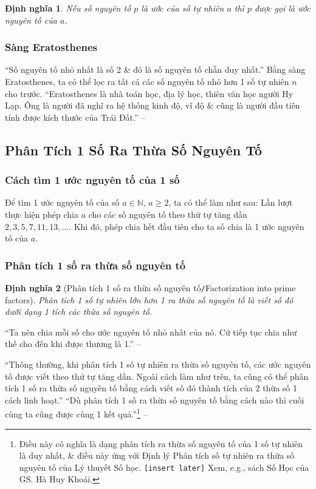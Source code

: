 \documentclass{article}
\numberwithin{equation}{section}
\newtheorem{definition}{Định nghĩa}[section]
\begin{document}
\begin{definition}
	Nếu số nguyên tố $p$ là ước của số tự nhiên $a$ thì $p$ được gọi là \emph{ước nguyên tố} của $a$.
\end{definition}

\subsubsection{Sàng Eratosthenes}
``Số nguyên tố nhỏ nhất là số 2 \& đó là số nguyên tố chẵn duy nhất.'' Bằng sàng Eratosthenes, ta có thể lọc ra tất cả các số nguyên tố nhỏ hơn 1 số tự nhiên $n$ cho trước. ``Eratosthenes là nhà toán học, địa lý học, thiên văn học người Hy Lạp. Ông là người đã nghĩ ra hệ thống kinh độ, vĩ độ \& cũng là người đầu tiên tính được kích thước của Trái Đất.'' -- \cite[p. 43]{Thai_Anh_Dat_Ha_Loan_Nam_Quang_Toan_6_tap_1}

\subsection{Phân Tích 1 Số Ra Thừa Số Nguyên Tố}

\subsubsection{Cách tìm 1 ước nguyên tố của 1 số}
\begin{tcolorbox}
	Để tìm 1 ước nguyên tố của số $a\in\mathbb{N}$, $a\ge 2$, ta có thể làm như sau: Lần lượt thực hiện phép chia $a$ cho các số nguyên tố theo thứ tự tăng dần $2,3,5,7,11,13,\ldots$. Khi đó, phép chia hết đầu tiên cho ta số chia là 1 ước nguyên tố của $a$.
\end{tcolorbox}

\subsubsection{Phân tích 1 số ra thừa số nguyên tố}

\begin{definition}[Phân tích 1 số ra thừa số nguyên tố\texttt{/}Factorization into prime factors]
	\emph{Phân tích 1 số tự nhiên lớn hơn 1 ra thừa số nguyên tố} là viết số đó dưới dạng 1 tích các thừa số nguyên tố.
\end{definition}
``Ta nên chia mỗi số cho ước nguyên tố nhỏ nhất của nó. Cứ tiếp tục chia như thế cho đến khi được thương là 1.'' -- \cite[p. 45]{Thai_Anh_Dat_Ha_Loan_Nam_Quang_Toan_6_tap_1}

``Thông thường, khi phân tích 1 số tự nhiên ra thừa số nguyên tố, các ước nguyên tố được viết theo thứ tự tăng dần. Ngoài cách làm như trên, ta cũng có thể phân tích 1 số ra thừa số nguyên tố bằng cách viết số đó thành tích của 2 thừa số 1 cách linh hoạt.'' ``Dù phân tích 1 số ra thừa số nguyên tố bằng cách nào thì cuối cùng ta cũng được cùng 1 kết quả.''\footnote{Điều này có nghĩa là dạng phân tích ra thừa số nguyên tố của 1 số tự nhiên là duy nhất, \& điều này ứng với Định lý Phân tích số tự nhiên ra thừa số nguyên tố của Lý thuyết Số học. \texttt{[insert later]} Xem, e.g., sách Số Học của GS. Hà Huy Khoái.} -- \cite[p. 46]{Thai_Anh_Dat_Ha_Loan_Nam_Quang_Toan_6_tap_1}
\end{document}
